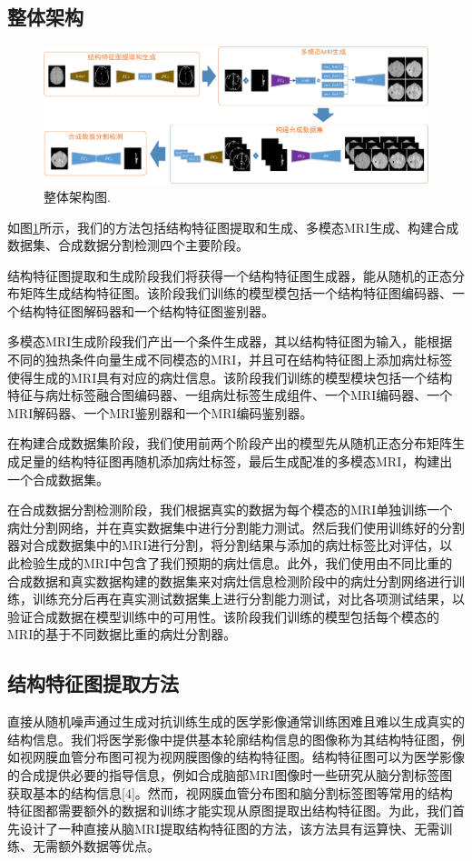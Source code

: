 \documentclass[letterpaper]{article} %
\begin{document}
\subsection{整体架构}
\begin{figure}
	\centering
	\includegraphics[width=0.98\linewidth]{figures/architecture}
	\caption{整体架构图.}
	\label{architecture}
\end{figure}
如图\ref{architecture}所示，我们的方法包括结构特征图提取和生成、多模态MRI生成、构建合成数据集、合成数据分割检测四个主要阶段。

结构特征图提取和生成阶段我们将获得一个结构特征图生成器，能从随机的正态分布矩阵生成结构特征图。该阶段我们训练的模型模包括一个结构特征图编码器、一个结构特征图解码器和一个结构特征图鉴别器。

多模态MRI生成阶段我们产出一个条件生成器，其以结构特征图为输入，能根据不同的独热条件向量生成不同模态的MRI，并且可在结构特征图上添加病灶标签使得生成的MRI具有对应的病灶信息。该阶段我们训练的模型模块包括一个结构特征与病灶标签融合图编码器、一组病灶标签生成组件、一个MRI编码器、一个MRI解码器、一个MRI鉴别器和一个MRI编码鉴别器。

在构建合成数据集阶段，我们使用前两个阶段产出的模型先从随机正态分布矩阵生成足量的结构特征图再随机添加病灶标签，最后生成配准的多模态MRI，构建出一个合成数据集。

在合成数据分割检测阶段，我们根据真实的数据为每个模态的MRI单独训练一个病灶分割网络，并在真实数据集中进行分割能力测试。然后我们使用训练好的分割器对合成数据集中的MRI进行分割，将分割结果与添加的病灶标签比对评估，以此检验生成的MRI中包含了我们预期的病灶信息。此外，我们使用由不同比重的合成数据和真实数据构建的数据集来对病灶信息检测阶段中的病灶分割网络进行训练，训练充分后再在真实测试数据集上进行分割能力测试，对比各项测试结果，以验证合成数据在模型训练中的可用性。该阶段我们训练的模型包括每个模态的MRI的基于不同数据比重的病灶分割器。

\subsection{结构特征图提取方法}
直接从随机噪声通过生成对抗训练生成的医学影像通常训练困难且难以生成真实的结构信息。我们将医学影像中提供基本轮廓结构信息的图像称为其结构特征图，例如视网膜血管分布图可视为视网膜图像的结构特征图\cite{41costa2017towards}。结构特征图可以为医学影像的合成提供必要的指导信息，例如合成脑部MRI图像时一些研究从脑分割标签图获取基本的结构信息[4]。然而，视网膜血管分布图和脑分割标签图等常用的结构特征图都需要额外的数据和训练才能实现从原图提取出结构特征图。为此，我们首先设计了一种直接从脑MRI提取结构特征图的方法，该方法具有运算快、无需训练、无需额外数据等优点。
\end{document}
